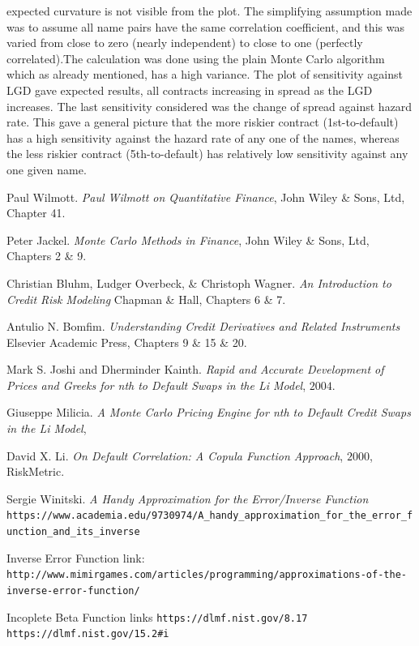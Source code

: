 \documentclass[a4paper,12pt]{article}
\begin{document}
expected curvature is not visible from the plot. The simplifying assumption made was to assume all name pairs have the same correlation coefficient, and this was varied from close to zero (nearly independent) to close to one (perfectly correlated).The calculation was done using the plain Monte Carlo algorithm which as already mentioned, has a high variance. The plot of sensitivity against LGD gave expected results, all contracts increasing in spread as the LGD increases. The last sensitivity considered was the change of spread against hazard rate. This gave a general picture that the more riskier contract (1st-to-default) has a high sensitivity against the hazard rate of any one of the names, whereas the less riskier contract (5th-to-default) has relatively low sensitivity against any one given name. 


\medskip

\begin{thebibliography}{20}
Paul Wilmott.
\textit{Paul Wilmott on Quantitative Finance},
John Wiley \& Sons, Ltd, Chapter 41.

Peter Jackel.
\textit{Monte Carlo Methods in Finance},
John Wiley \& Sons, Ltd, Chapters 2 \& 9.

Christian Bluhm, Ludger Overbeck, \& Christoph Wagner.
\textit{An Introduction to Credit Risk Modeling}
Chapman \& Hall, Chapters 6 \& 7.

Antulio N. Bomfim.
\textit{Understanding Credit Derivatives and Related Instruments}
Elsevier Academic Press, Chapters 9 \& 15 \& 20. 

Mark S. Joshi and Dherminder Kainth.
\textit{Rapid and Accurate Development of Prices and Greeks for nth to Default Swaps in the Li Model}, \(2004\).

Giuseppe Milicia.
\textit{A Monte Carlo Pricing Engine for nth to Default Credit Swaps in the Li Model},

David X. Li.
\textit{On Default Correlation: A Copula Function Approach}, \(2000\), RiskMetric. 

Sergie Winitski.
\textit{A Handy Approximation for the Error/Inverse Function}
\texttt{https://www.academia.edu/9730974/A\_handy\_approximation\_for\_the\_error\_function\_and\_its\_inverse}

Inverse Error Function link:
\newline
\texttt{http://www.mimirgames.com/articles/programming/approximations-of-the-inverse-error-function/}

Incoplete Beta Function links
\newline
\texttt{https://dlmf.nist.gov/8.17}
\newline
\texttt{https://dlmf.nist.gov/15.2\#i}


\end{thebibliography}
\end{document}
